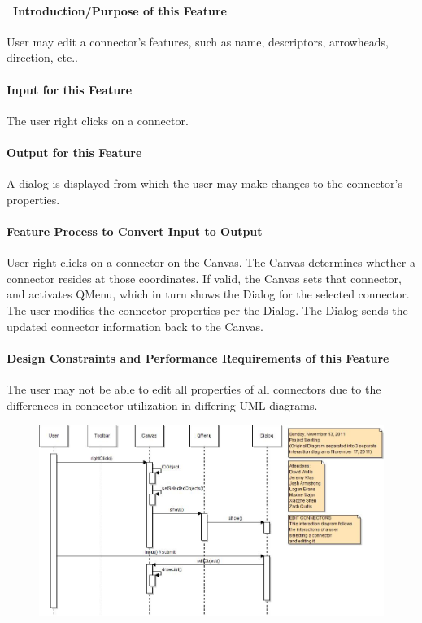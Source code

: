 \documentclass[twoside,letterpaper]{article}
\begin{document}
{\paragraph[\ Introduction/Purpose of this Feature]
{\ Introduction/Purpose of this Feature}
{\color{black}
User may edit a connector{\textquoteright}s features, such as name, descriptors, arrowheads, direction, etc..
}

\paragraph[Input for this Feature]{Input for this Feature}
{\color{black}
The user right clicks on a connector.
}

\paragraph{Output for this Feature}
{\color{black}
A dialog is displayed from which the user may make changes to the connector{\textquoteright}s properties.
}

\paragraph{Feature Process to Convert Input to Output}
{\color{black}
User right clicks on a connector on the Canvas. The Canvas determines whether a connector resides at those coordinates. If valid, the Canvas sets that connector, and activates QMenu, which in turn shows the Dialog for the selected connector.
The user modifies the connector properties per the Dialog.  The Dialog sends the updated connector information back to the Canvas.
}

\paragraph{Design Constraints and Performance Requirements of this Feature}
{\color{black}
The user may not be able to edit all properties of all connectors due to the differences in connector utilization in differing UML diagrams.
}
\bigskip
\bigskip

\begin{figure}[h]
\centering
\includegraphics[width=6.0in]{IntEditConn.jpg}
\end{figure}

}
\end{document}
